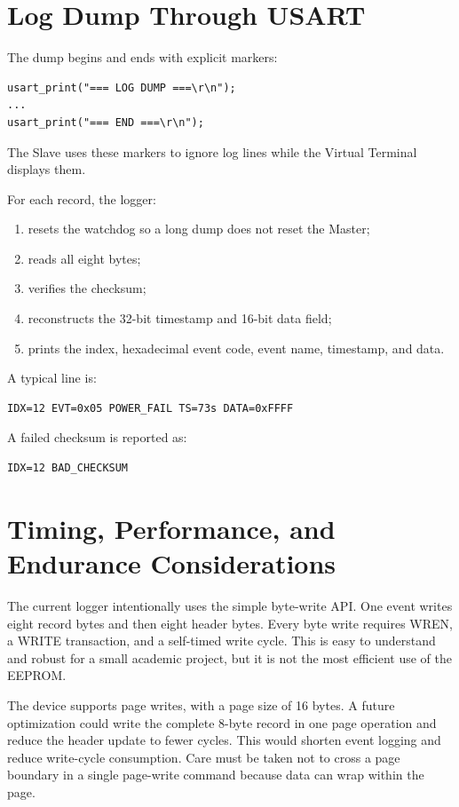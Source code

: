 \documentclass[11pt,a4paper]{article}
\begin{document}
\section{Log Dump Through USART}
The dump begins and ends with explicit markers:
\begin{lstlisting}[style=cstyle]
usart_print("=== LOG DUMP ===\r\n");
...
usart_print("=== END ===\r\n");
\end{lstlisting}
The Slave uses these markers to ignore log lines while the Virtual Terminal displays them.

For each record, the logger:
\begin{enumerate}
  \item resets the watchdog so a long dump does not reset the Master;
  \item reads all eight bytes;
  \item verifies the checksum;
  \item reconstructs the 32-bit timestamp and 16-bit data field;
  \item prints the index, hexadecimal event code, event name, timestamp, and data.
\end{enumerate}

A typical line is:
\begin{verbatim}
IDX=12 EVT=0x05 POWER_FAIL TS=73s DATA=0xFFFF
\end{verbatim}
A failed checksum is reported as:
\begin{verbatim}
IDX=12 BAD_CHECKSUM
\end{verbatim}

\section{Timing, Performance, and Endurance Considerations}
The current logger intentionally uses the simple byte-write API. One event writes eight record bytes and then eight header bytes. Every byte write requires WREN, a WRITE transaction, and a self-timed write cycle. This is easy to understand and robust for a small academic project, but it is not the most efficient use of the EEPROM.

The device supports page writes, with a page size of 16 bytes. A future optimization could write the complete 8-byte record in one page operation and reduce the header update to fewer cycles. This would shorten event logging and reduce write-cycle consumption. Care must be taken not to cross a page boundary in a single page-write command because data can wrap within the page.
\end{document}

